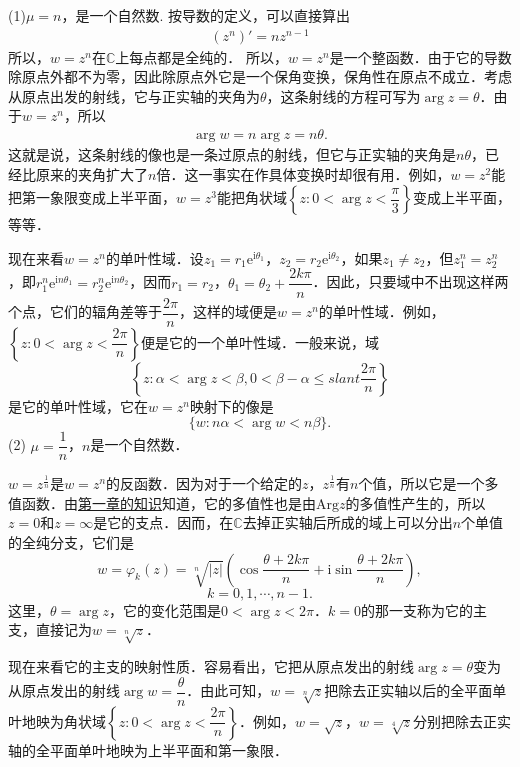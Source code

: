 \documentclass[../../main.tex]{subfiles}
\begin{document}
(1)$\mu = n$，是一个自然数.
按导数的定义，可以直接算出
\begin{align*}
(z^n)' = nz^{n - 1}
\end{align*}
所以，$w = z^n$在$\mathbb{C}$上每点都是全纯的．
所以，$w = z^n$是一个整函数．由于它的导数除原点外都不为零，因此除原点外它是一个保角变换，保角性在原点不成立．考虑从原点出发的射线，它与正实轴的夹角为$\theta$，这条射线的方程可写为$\arg z = \theta$．由于$w = z^n$，所以
\begin{align*}
\arg w = n\arg z = n\theta.
\end{align*}
这就是说，这条射线的像也是一条过原点的射线，但它与正实轴的夹角是$n\theta$，已经比原来的夹角扩大了$n$倍．这一事实在作具体变换时却很有用．例如，$w = z^2$能把第一象限变成上半平面，$w = z^3$能把角状域$\left\{ z: 0 < \arg z < \dfrac{\pi}{3} \right\}$变成上半平面，等等．

现在来看$w = z^n$的单叶性域．设$z_1 = r_1\text{e}^{\text{i}\theta_1}$，$z_2 = r_2\text{e}^{\text{i}\theta_2}$，如果$z_1 \neq z_2$，但$z_1^n = z_2^n$，即$r_1^n\text{e}^{\text{i}n\theta_1} = r_2^n\text{e}^{\text{i}n\theta_2}$，因而$r_1 = r_2$，$\theta_1 = \theta_2 + \dfrac{2k\pi}{n}$．因此，只要域中不出现这样两个点，它们的辐角差等于$\dfrac{2\pi}{n}$，这样的域便是$w = z^n$的单叶性域．例如，$\left\{ z: 0 < \arg z < \dfrac{2\pi}{n} \right\}$便是它的一个单叶性域．一般来说，域
\[
\left\{ z: \alpha < \arg z < \beta, 0 < \beta - \alpha \leqslant slant \dfrac{2\pi}{n} \right\}
\]
是它的单叶性域，它在$w = z^n$映射下的像是
\[
\{ w: n\alpha < \arg w < n\beta \}.
\]
(2) $\mu = \dfrac{1}{n}$，$n$是一个自然数．

$w = z^{\frac{1}{n}}$是$w = z^n$的反函数．因为对于一个给定的$z$，$z^{\frac{1}{n}}$有$n$个值，所以它是一个多值函数．由\hyperref[section:复数的几何表示]{第一章的知识}知道，它的多值性也是由$\text{Arg}z$的多值性产生的，所以$z = 0$和$z = \infty$是它的支点．因而，在$\mathbb{C}$去掉正实轴后所成的域上可以分出$n$个单值的全纯分支，它们是
\[
w = \varphi_k(z) = \sqrt[n]{|z|} \left( \cos \dfrac{\theta + 2k\pi}{n} + \text{i}\sin \dfrac{\theta + 2k\pi}{n} \right),
\]
\[
k = 0,1,\cdots,n - 1.
\]
这里，$\theta = \arg z$，它的变化范围是$0 < \arg z < 2\pi$．$k = 0$的那一支称为它的主支，直接记为$w = \sqrt[n]{z}$．

现在来看它的主支的映射性质．容易看出，它把从原点发出的射线$\arg z = \theta$变为从原点发出的射线$\arg w = \dfrac{\theta}{n}$．由此可知，$w = \sqrt[n]{z}$把除去正实轴以后的全平面单叶地映为角状域$\left\{ z: 0 < \arg z < \dfrac{2\pi}{n} \right\}$．例如，$w = \sqrt{z}$，$w = \sqrt[4]{z}$分别把除去正实轴的全平面单叶地映为上半平面和第一象限．
\end{document}
